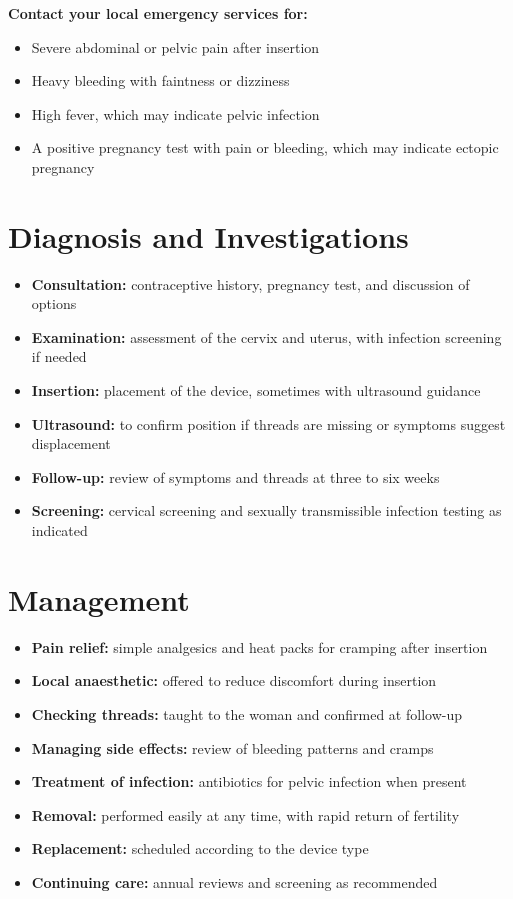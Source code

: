 \textbf{Contact your local emergency services for:}
\begin{itemize}
    \item Severe abdominal or pelvic pain after insertion
    \item Heavy bleeding with faintness or dizziness
    \item High fever, which may indicate pelvic infection
    \item A positive pregnancy test with pain or bleeding, which may indicate ectopic pregnancy
\end{itemize}

\section*{Diagnosis and Investigations}
\begin{itemize}
    \item \textbf{Consultation:} contraceptive history, pregnancy test, and discussion of options
    \item \textbf{Examination:} assessment of the cervix and uterus, with infection screening if needed
    \item \textbf{Insertion:} placement of the device, sometimes with ultrasound guidance
    \item \textbf{Ultrasound:} to confirm position if threads are missing or symptoms suggest displacement
    \item \textbf{Follow-up:} review of symptoms and threads at three to six weeks
    \item \textbf{Screening:} cervical screening and sexually transmissible infection testing as indicated
\end{itemize}

\section*{Management}
\begin{itemize}
    \item \textbf{Pain relief:} simple analgesics and heat packs for cramping after insertion
    \item \textbf{Local anaesthetic:} offered to reduce discomfort during insertion
    \item \textbf{Checking threads:} taught to the woman and confirmed at follow-up
    \item \textbf{Managing side effects:} review of bleeding patterns and cramps
    \item \textbf{Treatment of infection:} antibiotics for pelvic infection when present
    \item \textbf{Removal:} performed easily at any time, with rapid return of fertility
    \item \textbf{Replacement:} scheduled according to the device type
    \item \textbf{Continuing care:} annual reviews and screening as recommended
\end{itemize}

